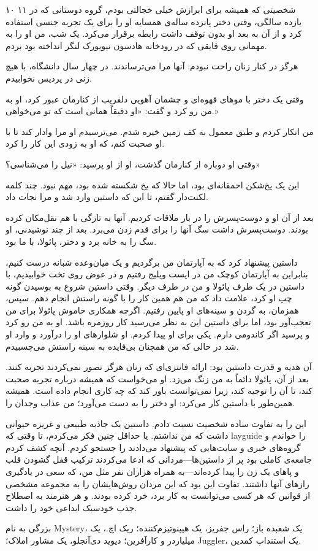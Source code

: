 ۱۰  
۱۱  
شخصیتی که همیشه برای ابرازش خیلی خجالتی بودم، گروه دوستانی که در یازده سالگی، وقتی دختر پانزده ساله‌ی همسایه او را برای یک تجربه جنسی استفاده کرد و از آن به بعد او بدون توقف داشت رابطه برقرار می‌کرد. یک شب، من او را به مهمانی روی قایقی که در رودخانه هادسون نیویورک لنگر انداخته بود بردم.  

هرگز در کنار زنان راحت نبودم: آنها مرا می‌ترساندند. در چهار سال دانشگاه، با هیچ زنی در پردیس نخوابیدم.  

وقتی یک دختر با موهای قهوه‌ای و چشمان آهویی دلفریب از کنارمان عبور کرد، او به من رو کرد و گفت: «او دقیقاً همانی است که تو می‌خواهی.»  

من انکار کردم و طبق معمول به کف زمین خیره شدم. می‌ترسیدم او مرا وادار کند تا با او صحبت کنم، که او به زودی این کار را کرد.  

وقتی او دوباره از کنارمان گذشت، او از او پرسید: «نیل را می‌شناسی؟»  

این یک یخ‌شکن احمقانه‌ای بود، اما حالا که یخ شکسته شده بود، مهم نبود. چند کلمه لکنت‌دار گفتم، تا این که داستین وارد شد و مرا نجات داد.  

بعد از آن او و دوست‌پسرش را در بار ملاقات کردیم. آنها به تازگی با هم نقل‌مکان کرده بودند. دوست‌پسرش داشت سگ آنها را برای قدم زدن می‌برد. بعد از چند نوشیدنی، او سگ را به خانه برد و دختر، پائولا، با ما بود.  

داستین پیشنهاد کرد که به آپارتمان من برگردیم و یک میان‌وعده شبانه درست کنیم، بنابراین به آپارتمان کوچک من در ایست ویلیج رفتیم و در عوض روی تخت خوابیدیم، با داستین در یک طرف پائولا و من در طرف دیگر. وقتی داستین شروع به بوسیدن گونه چپ او کرد، علامت داد که من هم همین کار را با گونه راستش انجام دهم. سپس، همزمان، به گردن و سینه‌های او پایین رفتیم. اگرچه همکاری خاموش پائولا برای من تعجب‌آور بود، اما برای داستین این به نظر می‌رسید کار روزمره باشد. او به من رو کرد و پرسید اگر کاندومی دارم. یکی برای او پیدا کردم. او شلوارهای او را درآورد و وارد او شد در حالی که من همچنان بی‌فایده به سینه راستش می‌چسبیدم.  

آن هدیه و قدرت داستین بود: ارائه فانتزی‌ای که زنان هرگز تصور نمی‌کردند تجربه کنند. بعد از آن، پائولا دائماً به من زنگ می‌زد. او می‌خواست که همیشه درباره تجربه صحبت کند، تا آن را توجیه کند، زیرا نمی‌توانست باور کند که چه کاری انجام داده است. همیشه همین‌طور با داستین کار می‌کرد: او دختر را به دست می‌آورد؛ من عذاب وجدان را.

این را به تفاوت ساده شخصیت نسبت دادم. داستین یک جاذبه طبیعی و غریزه حیوانی داشت که من نداشتم. یا حداقل چنین فکر می‌کردم، تا وقتی که layguide را خواندم و گروه‌های خبری و سایت‌هایی که پیشنهاد می‌دادند را جستجو کردم. آنچه کشف کردم جامعه‌ی کاملی بود پر از داستین‌ها—مردانی که ادعا می‌کردند ترکیب قفل گشودن قلب و پاهای یک زن را پیدا کرده‌اند—به همراه هزاران نفر مثل من، که سعی در یادگیری رازهای آنها داشتند. تفاوت این بود که این مردان روش‌هایشان را به مجموعه مشخصی از قوانین که هر کسی می‌توانست به کار برد، خرد کرده بودند. و هر هنرمند به اصطلاح جذب خودسبک ابداعی خود را داشت. 

بزرگی به نام Mystery، یک شعبده باز؛ راس جفریز، یک هیپنوتیزم‌کننده؛ ریک اچ.، یک میلیاردر و کارآفرین؛ دیوید دی‌آنجلو، یک مشاور املاک؛ Juggler، یک استنداپ کمدین.